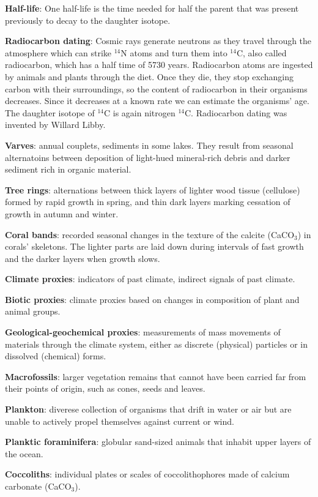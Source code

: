 \textbf{Half-life}: One half-life is the time needed for half the parent that
was present previously to decay to the daughter isotope.

\textbf{Radiocarbon dating}: Cosmic rays generate neutrons as they travel
through the atmosphere which can strike $^{14}$N atoms and turn them into
$^{14}$C, also called radiocarbon, which has a half time of 5730 years.
Radiocarbon atoms are ingested by animals and plants through the diet. Once
they die, they stop exchanging carbon with their surroundings, so the content
of radiocarbon in their organisms decreases. Since it decreases at a known rate
we can estimate the organisms' age. The daughter isotope of $^{14}$C is again
nitrogen $^{14}$C. Radiocarbon dating was invented by Willard Libby.

\textbf{Varves}: annual couplets, sediments in some lakes. They result from
seasonal alternatoins between deposition of light-hued mineral-rich debris
and darker sediment rich in organic material.

\textbf{Tree rings}: alternations between thick layers of lighter wood tissue
(cellulose) formed by rapid growth in spring, and thin dark layers marking
cessation of growth in autumn and winter.

\textbf{Coral bands}: recorded seasonal changes in the texture of the calcite
(CaCO$_3$) in corals' skeletons. The lighter parts are laid down during
intervals of fast growth and the darker layers when growth slows.

\textbf{Climate proxies}: indicators of past climate, indirect signals of
past climate.

\textbf{Biotic proxies}: climate proxies based on changes in composition of
plant and animal groups.

\textbf{Geological-geochemical proxies}: measurements of mass movements of
materials through the climate system, either as discrete (physical) particles
or in dissolved (chemical) forms.

\textbf{Macrofossils}: larger vegetation remains that cannot have been carried
far from their points of origin, such as cones, seeds and leaves.

\textbf{Plankton}: diverese collection of organisms that drift in water or air
but are unable to actively propel themselves against current or wind.

\textbf{Planktic foraminifera}: globular sand-sized animals that inhabit upper
layers of the ocean.

\textbf{Coccoliths}: individual plates or scales of coccolithophores made of
calcium carbonate (CaCO$_3$).

